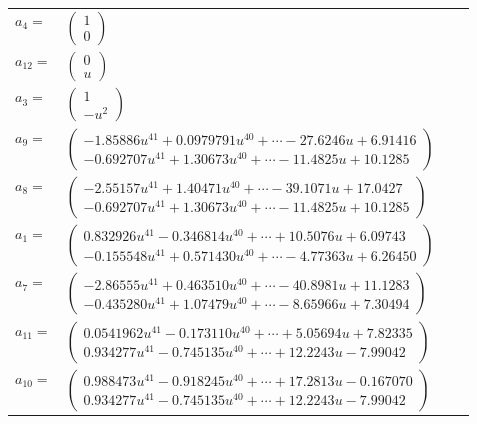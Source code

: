 \documentclass[1p]{elsarticle_modified}
\theoremstyle{definition}
\begin{document}
\begin{tabular}{m{7pt} m{180pt} m{7pt} m{180pt} }
\flushright $a_{4}=$&$\begin{pmatrix}1\\0\end{pmatrix}$ \\
\flushright $a_{12}=$&$\begin{pmatrix}0\\u\end{pmatrix}$ \\
\flushright $a_{3}=$&$\begin{pmatrix}1\\- u^2\end{pmatrix}$ \\
\flushright $a_{9}=$&$\begin{pmatrix}-1.85886 u^{41}+0.0979791 u^{40}+\cdots-27.6246 u+6.91416\\-0.692707 u^{41}+1.30673 u^{40}+\cdots-11.4825 u+10.1285\end{pmatrix}$ \\
\flushright $a_{8}=$&$\begin{pmatrix}-2.55157 u^{41}+1.40471 u^{40}+\cdots-39.1071 u+17.0427\\-0.692707 u^{41}+1.30673 u^{40}+\cdots-11.4825 u+10.1285\end{pmatrix}$ \\
\flushright $a_{1}=$&$\begin{pmatrix}0.832926 u^{41}-0.346814 u^{40}+\cdots+10.5076 u+6.09743\\-0.155548 u^{41}+0.571430 u^{40}+\cdots-4.77363 u+6.26450\end{pmatrix}$ \\
\flushright $a_{7}=$&$\begin{pmatrix}-2.86555 u^{41}+0.463510 u^{40}+\cdots-40.8981 u+11.1283\\-0.435280 u^{41}+1.07479 u^{40}+\cdots-8.65966 u+7.30494\end{pmatrix}$ \\
\flushright $a_{11}=$&$\begin{pmatrix}0.0541962 u^{41}-0.173110 u^{40}+\cdots+5.05694 u+7.82335\\0.934277 u^{41}-0.745135 u^{40}+\cdots+12.2243 u-7.99042\end{pmatrix}$ \\
\flushright $a_{10}=$&$\begin{pmatrix}0.988473 u^{41}-0.918245 u^{40}+\cdots+17.2813 u-0.167070\\0.934277 u^{41}-0.745135 u^{40}+\cdots+12.2243 u-7.99042\end{pmatrix}$ \\

\end{tabular}
\end{document}
